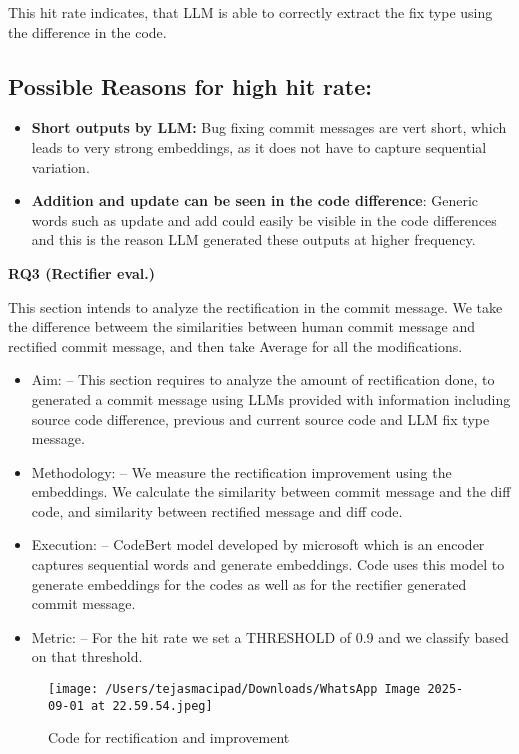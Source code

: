 \documentclass[12pt, a4paper]{report}
\begin{document}
This hit rate indicates, that LLM is able to correctly extract the fix type using the difference in the code. 

\subsection{Possible Reasons for high hit rate:}

\begin{itemize}
    \item \textbf{Short outputs by LLM:} Bug fixing commit messages are vert short, which leads to very strong embeddings, as it does not have to capture sequential variation.
    \item \textbf{Addition and update can be seen in the code difference}: Generic words such as update and add could easily be visible in the code differences and this is the reason LLM generated these outputs at higher frequency.
\end{itemize}



\textbf{RQ3 (Rectifier eval.)}

This section intends to analyze the rectification in the commit message. We take the difference betweem the similarities between human commit message and rectified commit message, and then take Average for all the modifications.

\begin{itemize}
    \item {Aim:} -- This section requires to analyze the amount of rectification done, to generated a commit message using LLMs provided with information including source code difference, previous and current source code and LLM fix type message.
    \item {Methodology:} -- We measure the rectification improvement using the embeddings. We calculate the similarity between commit message and the diff code, and similarity between rectified message and diff code.
    \item {Execution:} -- CodeBert model developed by microsoft which is an encoder captures sequential words and generate embeddings. Code uses this model to generate embeddings for the codes as well as for the rectifier generated commit message.
    \item {Metric: } -- For the hit rate we set a THRESHOLD of 0.9 and we classify based on that threshold.
\end{itemize}

\begin{figure}[h!]
    \centering
    \texttt{[image: /Users/tejasmacipad/Downloads/WhatsApp Image 2025-09-01 at 22.59.54.jpeg]}
    \caption{Code for rectification and improvement}
\end{figure}
\end{document}

